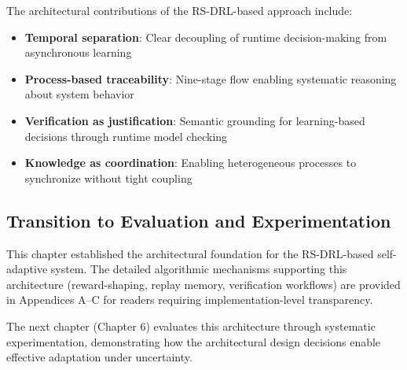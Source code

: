 \documentclass[11pt,a4paper]{article}
\begin{document}
The architectural contributions of the RS-DRL-based approach include:

\begin{itemize}
    \item \textbf{Temporal separation}: Clear decoupling of runtime decision-making from asynchronous learning
    \item \textbf{Process-based traceability}: Nine-stage flow enabling systematic reasoning about system behavior
    \item \textbf{Verification as justification}: Semantic grounding for learning-based decisions through runtime model checking
    \item \textbf{Knowledge as coordination}: Enabling heterogeneous processes to synchronize without tight coupling
\end{itemize}

\subsection{Transition to Evaluation and Experimentation}
\label{subsec:transition}

This chapter established the architectural foundation for the RS-DRL-based self-adaptive system. The detailed algorithmic mechanisms supporting this architecture (reward-shaping, replay memory, verification workflows) are provided in Appendices A--C for readers requiring implementation-level transparency.

The next chapter (Chapter 6) evaluates this architecture through systematic experimentation, demonstrating how the architectural design decisions enable effective adaptation under uncertainty.
\end{document}
